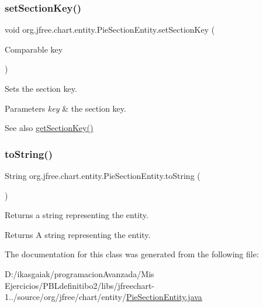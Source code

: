 \subsubsection{\texorpdfstring{set\+Section\+Key()}{setSectionKey()}}
{\footnotesize\ttfamily void org.\+jfree.\+chart.\+entity.\+Pie\+Section\+Entity.\+set\+Section\+Key (\begin{DoxyParamCaption}\item[{Comparable}]{key }\end{DoxyParamCaption})}

Sets the section key.


\begin{DoxyParams}{Parameters}
{\em key} & the section key.\\
\hline
\end{DoxyParams}
\begin{DoxySeeAlso}{See also}
\mbox{\hyperlink{classorg_1_1jfree_1_1chart_1_1entity_1_1_pie_section_entity_ac1c641ae979fd28641726ab3a93bd443}{get\+Section\+Key()}} 
\end{DoxySeeAlso}
\mbox{\label{classorg_1_1jfree_1_1chart_1_1entity_1_1_pie_section_entity_a754273c9016db7410eb71827df1a1a75}} 
\subsubsection{\texorpdfstring{to\+String()}{toString()}}
{\footnotesize\ttfamily String org.\+jfree.\+chart.\+entity.\+Pie\+Section\+Entity.\+to\+String (\begin{DoxyParamCaption}{ }\end{DoxyParamCaption})}

Returns a string representing the entity.

\begin{DoxyReturn}{Returns}
A string representing the entity. 
\end{DoxyReturn}


The documentation for this class was generated from the following file\+:\begin{DoxyCompactItemize}
\item 
D\+:/ikasgaiak/programacion\+Avanzada/\+Mis Ejercicios/\+P\+B\+Ldefinitibo2/libs/jfreechart-\/1../source/org/jfree/chart/entity/\mbox{\hyperlink{_pie_section_entity_8java}{Pie\+Section\+Entity.\+java}}\end{DoxyCompactItemize}
